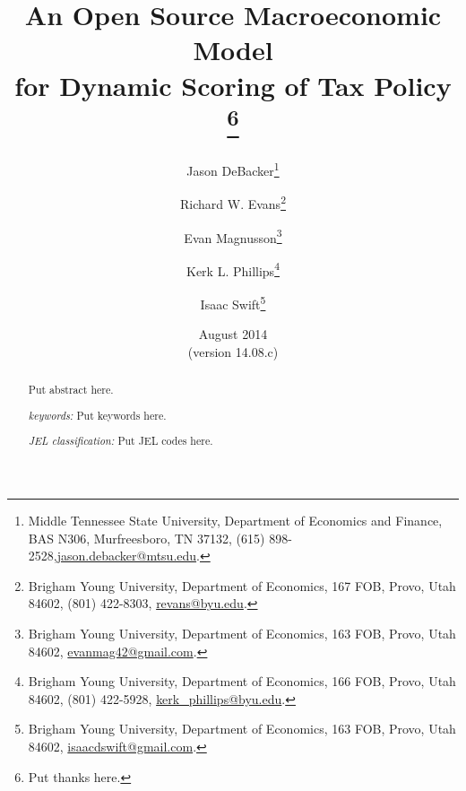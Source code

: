 \documentclass[letterpaper,12pt]{article}
\theoremstyle{definition}
\begin{document}
\begin{titlepage}
\title{An Open Source Macroeconomic Model \\
       for Dynamic Scoring of Tax Policy
       \thanks{
       Put thanks here.}
       }
\author{
  Jason DeBacker\footnote{Middle Tennessee State University, Department of Economics and Finance, BAS N306, Murfreesboro, TN 37132, (615) 898-2528,\href{mailto:jason.debacker@mtsu.edu}{jason.debacker@mtsu.edu}.} \\[-2pt]
  \and
  Richard W. Evans\footnote{Brigham Young University, Department of Economics, 167 FOB, Provo, Utah 84602, (801) 422-8303, \href{mailto:revans@byu.edu}{revans@byu.edu}.} \\[-2pt]
  \and
  Evan Magnusson\footnote{Brigham Young University, Department of Economics, 163 FOB, Provo, Utah 84602, \href{mailto:evanmag42@gmail.com}{evanmag42@gmail.com}.} \\[-2pt]
  \and
  Kerk L. Phillips\footnote{Brigham Young University, Department of Economics, 166 FOB, Provo, Utah 84602, (801) 422-5928, \href{mailto:kerk_phillips@byu.edu}{kerk\_phillips@byu.edu}.} \\[-2pt]
  \and
  Isaac Swift\footnote{Brigham Young University, Department of Economics, 163 FOB, Provo, Utah 84602, \href{mailto:isaacdswift@gmail.com}{isaacdswift@gmail.com}.} \\[-2pt]}
\date{August 2014 \\
  \scriptsize{(version 14.08.c)}}
\maketitle
\begin{abstract}
\normalsize{Put abstract here.

\vspace{3mm}

\noindent\textit{keywords:}\: Put keywords here.

\vspace{3mm}

\noindent\textit{JEL classification:} Put JEL codes here.}
\end{abstract}
\thispagestyle{empty}
\end{titlepage}
\end{document}
